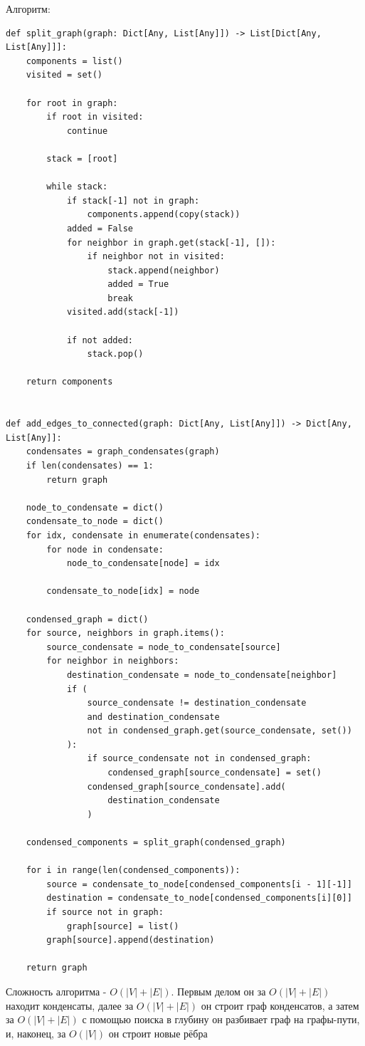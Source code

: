 \documentclass{article}
\begin{document}
\begin{enumerate}
\begin{enumerate}
		            Алгоритм:
		            \begin{lstlisting}
def split_graph(graph: Dict[Any, List[Any]]) -> List[Dict[Any, List[Any]]]:
	components = list()
	visited = set()

	for root in graph:
		if root in visited:
			continue

		stack = [root]

		while stack:
			if stack[-1] not in graph:
				components.append(copy(stack))
			added = False
			for neighbor in graph.get(stack[-1], []):
				if neighbor not in visited:
					stack.append(neighbor)
					added = True
					break
			visited.add(stack[-1])

			if not added:
				stack.pop()

	return components


def add_edges_to_connected(graph: Dict[Any, List[Any]]) -> Dict[Any, List[Any]]:
	condensates = graph_condensates(graph)
	if len(condensates) == 1:
		return graph

	node_to_condensate = dict()
	condensate_to_node = dict()
	for idx, condensate in enumerate(condensates):
		for node in condensate:
			node_to_condensate[node] = idx

		condensate_to_node[idx] = node

	condensed_graph = dict()
	for source, neighbors in graph.items():
		source_condensate = node_to_condensate[source]
		for neighbor in neighbors:
			destination_condensate = node_to_condensate[neighbor]
			if (
				source_condensate != destination_condensate
				and destination_condensate
				not in condensed_graph.get(source_condensate, set())
			):
				if source_condensate not in condensed_graph:
					condensed_graph[source_condensate] = set()
				condensed_graph[source_condensate].add(
					destination_condensate
				)

	condensed_components = split_graph(condensed_graph)

	for i in range(len(condensed_components)):
		source = condensate_to_node[condensed_components[i - 1][-1]]
		destination = condensate_to_node[condensed_components[i][0]]
		if source not in graph:
			graph[source] = list()
		graph[source].append(destination)

	return graph
				\end{lstlisting}

		            Сложность алгоритма - $O(\left| V \right| + \left| E \right|)$.
		            Первым делом он за $O(\left| V \right| + \left| E \right|)$
		            находит конденсаты, далее за
		            $O(\left| V \right| + \left| E \right|)$
		            он строит граф конденсатов, а затем за
		            $O(\left| V \right| + \left| E \right|)$
		            с помощью поиска в глубину он разбивает граф
		            на графы-пути, и, наконец, за
		            $O(\left| V \right|)$ он строит новые рёбра


\end{enumerate}
\end{enumerate}
\end{document}
